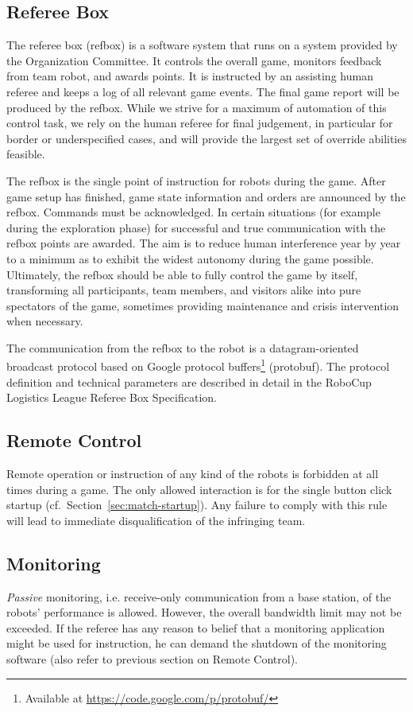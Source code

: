 \documentclass[12pt,twoside]{article}
\newcommand{\refsec}[1]{Section~\ref{#1}}
\begin{document}
\subsection{Referee Box}
\label{sec:refbox}
The referee box (refbox) is a software system that runs on a system
provided by the Organization Committee. It controls the overall game,
monitors feedback from team robot, and awards points. It is instructed
by an assisting human referee and keeps a log of all relevant game
events. The final game report will be produced by the refbox. While we
strive for a maximum of automation of this control task, we rely on
the human referee for final judgement, in particular for border or
underspecified cases, and will provide the largest set of override
abilities feasible.

The refbox is the single point of instruction for robots during the
game. After game setup has finished, game state information and orders
are announced by the refbox. Commands must be acknowledged. In certain
situations (for example during the exploration phase) for successful
and true communication with the refbox points are awarded. The aim is
to reduce human interference year by year to a minimum as to exhibit
the widest autonomy during the game possible. Ultimately, the refbox
should be able to fully control the game by itself, transforming all
participants, team members, and visitors alike into pure spectators of
the game, sometimes providing maintenance and crisis intervention when
necessary.

The communication from the refbox to the robot is a datagram-oriented
broadcast protocol based on Google protocol buffers\footnote{Available
  at \url{https://code.google.com/p/protobuf/}} (protobuf). The
protocol definition and technical parameters are described in detail
in the RoboCup Logistics League Referee Box Specification.

\subsection{Remote Control}
\label{sec:remote-control}
Remote operation or instruction of any kind of the robots is forbidden
at all times during a game. The only allowed interaction is for the
single button click startup (cf.~\refsec{sec:match-startup}). Any
failure to comply with this rule will lead to immediate
disqualification of the infringing team.

\subsection{Monitoring}
\label{sec:monitoring}
\emph{Passive} monitoring, i.e. receive-only communication from a base
station, of the robots' performance is allowed. However, the overall
bandwidth limit may not be exceeded.
If the referee has any reason to belief that a monitoring application
might be used for instruction, he can demand the shutdown of the
monitoring software (also refer to previous section on Remote
Control).
\end{document}
